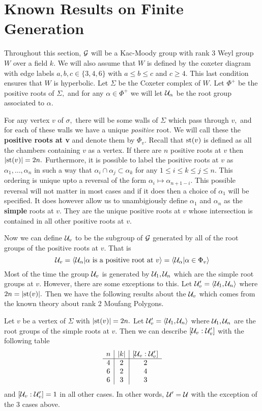 \documentclass[class=book, crop=false,12 pt]{standalone}
\begin{document}
\chapter{Known Results on Finite Generation}

Throughout this section, $\mathcal{G}$ will be a Kac-Moody group with rank 3 Weyl group $W$ over a field $k.$ We will also assume that $W$ is defined by the coxeter diagram with edge labels $a,b,c\in\{3,4,6\}$ with $a\le b\le c$ and $c\ge 4.$ This last condition ensures that $W$ is hyperbolic. Let $\Sigma$ be the Coxeter complex of $W.$ Let $\Phi^+$ be the positive roots of $\Sigma,$ and for any $\alpha\in \Phi^+$ we will let $\mathcal{U}_\alpha$ be the root group associated to $\alpha.$

For any vertex $v$ of $\sigma,$ there will be some walls of $\Sigma$ which pass through $v,$ and for each of these walls we have a unique \emph{positive} root. We will call these the \textbf{positive roots at v} and denote them by $\Phi_v.$ Recall that $\mathrm{st}(v)$ is defined as all the chambers containing $v$ as a vertex. If there are $n$ positive roots at $v$ then $|\mathrm{st}(v)|=2n.$ Furthermore, it is possible to label the positive roots at $v$ as $\alpha_1,\dots,\alpha_n$ in such a way that $\alpha_i\cap \alpha_j\subset \alpha_k$ for any $1\le i\le k\le j\le n.$ This ordering is unique upto a reversal of the form $\alpha_i\mapsto \alpha_{n+1-i}.$ This possible reversal will not matter in most cases and if it does then a choice of $\alpha_1$ will be specified. It does however allow us to unambigiously define $\alpha_1$ and $\alpha_n$ as the \textbf{simple} roots at $v.$ They are the unique positive roots at $v$ whose intersection is contained in all other positive roots at $v.$

Now we can define $\mathcal{U}_v$ to be the subgroup of $\mathcal{G}$ generated by all of the root groups of the positive roots at $v.$ That is
\[
\mathcal{U}_v=\langle \mathcal{U}_\alpha|\alpha \text{ is a positive root at }v\rangle=\langle \mathcal{U}_\alpha|\alpha\in \Phi_v\rangle
\]
Most of the time the group $\mathcal{U}_v$ is generated by $\mathcal{U}_1,\mathcal{U}_n$ which are the simple root groups at $v.$ However, there are some exceptions to this. Let $\mathcal{U}'_v=\langle \mathcal{U}_1,\mathcal{U}_n\rangle$ where $2n=|\mathrm{st}(v)|.$ Then we have the following results about the $\mathcal{U}_v$ which comes from the known theory about rank 2 Moufang Polygons.
\begin{lemma}
	\label{simpleindex}
	Let $v$ be a vertex of $\Sigma$ with $|\mathrm{st}(v)|=2n.$ Let $\mathcal{U}'_v=\langle \mathcal{U}_1,\mathcal{U}_n\rangle$ where $\mathcal{U}_1,\mathcal{U}_n$ are the root groups of the simple roots at $v.$ Then we can describe $[\mathcal{U}_v:\mathcal{U}'_v]$ with the following table
	\[
		\begin{array}{c|c|c}
			n&|k|&[\mathcal{U}_v:\mathcal{U}'_v]\\\hline
			4&2&2\\
			6&2&4\\
			6&3&3
		\end{array}
	\]
	and $[\mathcal{U}_v:\mathcal{U}'_v]=1$ in all other cases. In other words, $\mathcal{U}'=\mathcal{U}$ with the exception of the 3 cases above.
\end{lemma}
\end{document}
